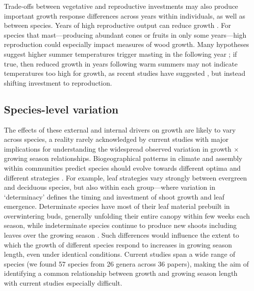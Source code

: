 \documentclass[11pt]{article}
\begin{document}
Trade-offs between vegetative and reproductive investments may also produce important growth response differences across years within individuals, as well as between species. Years of high reproductive output can reduce growth \citep{thomas2011bookchptr,hacket2016tree}. For species that mast---producing abundant cones or fruits in only some years---high reproduction could especially impact measures of wood growth. Many hypotheses suggest higher summer temperatures trigger masting in the following year \citep{hacket2016tree,hacket2016consistent}; if true, then reduced growth in years following warm summers may not indicate temperatures too high for growth, as recent studies have suggested \citep[e.g.,][]{gantois2022new,dow2022warm}, but instead shifting investment to reproduction.

\subsection*{Species-level variation}
The effects of these external and internal drivers on growth are likely to vary across species, a reality rarely acknowledged by current studies \citep[Fig. \ref{fig:hypotheses}c, though species strongly predicts variation when studied, e.g.,][]{cuny2012life,michelot2012comparing} with major implications for understanding the widespread observed variation in growth $\times$ growing season relationships. Biogeographical patterns in climate and assembly within communities predict species should evolve towards different optima and different strategies \citep{Ackerly:2009ly,buckley2012functional}. For example, leaf strategies vary strongly between evergreen and deciduous species, but also within each group---where variation in `determinacy' defines the timing and investment of shoot growth and leaf emergence. Determinate species have most of their leaf material prebuilt in overwintering buds, generally unfolding their entire canopy within few weeks each season, while indeterminate species continue to produce new shoots including leaves over the growing season \citep{kikuzawa1982leaf,Lechowicz:1984cr}. Such differences would influence the extent to which the growth of different species respond to increases in growing season length, even under identical conditions. Current studies span a wide range of species (we found  57 species from 26 genera across 36 papers), making the aim of identifying a common relationship between growth and growing season length with current studies especially difficult.
\end{document}

